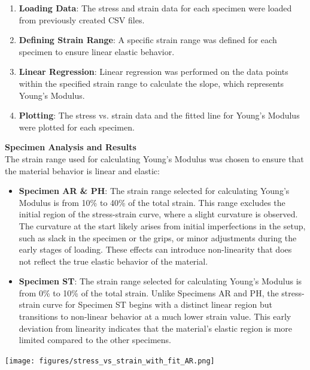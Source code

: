\documentclass{article}
\begin{document}
{\begin{enumerate}
    \item \textbf{Loading Data}: The stress and strain data for each specimen were loaded from previously created CSV files.
    \item \textbf{Defining Strain Range}: A specific strain range was defined for each specimen to ensure linear elastic behavior.
    \item \textbf{Linear Regression}: Linear regression was performed on the data points within the specified strain range to calculate the slope, which represents Young's Modulus.
    \item \textbf{Plotting}: The stress vs. strain data and the fitted line for Young's Modulus were plotted for each specimen.
\end{enumerate}
\newpage
\textbf{Specimen Analysis and Results}\\[8pt]
The strain range used for calculating Young's Modulus was chosen to ensure that the material behavior is linear and elastic:  
\begin{itemize}
    \item \textbf{Specimen AR \& PH}: The strain range selected for calculating Young's Modulus is from 10\% to 40\% of the total strain. This range excludes the initial region of the stress-strain curve, where a slight curvature is observed. The curvature at the start likely arises from initial imperfections in the setup, such as slack in the specimen or the grips, or minor adjustments during the early stages of loading. These effects can introduce non-linearity that does not reflect the true elastic behavior of the material.
    \item \textbf{Specimen ST}: The strain range selected for calculating Young's Modulus is from 0\% to 10\% of the total strain. Unlike Specimens AR and PH, the stress-strain curve for Specimen ST begins with a distinct linear region but transitions to non-linear behavior at a much lower strain value. This early deviation from linearity indicates that the material’s elastic region is more limited compared to the other specimens.
\end{itemize}
\vspace{1em}
\begin{minipage}[t]{0.3\textwidth}
    \centering
    \texttt{[image: figures/stress\_vs\_strain\_with\_fit\_AR.png]}
    \label{fig:stress_strain_AR}
\end{minipage}%
\hfill%
\begin{minipage}[t]{0.3\textwidth}

\end{minipage}}
\end{document}
